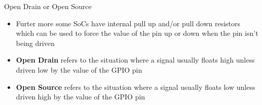 \begin{frame}
   {Open Drain or Open Source}
   \begin{itemize}
      \item Furter more some SoCs have internal pull up and/or pull down resistors
            which can be used to force the value of the pin up or down when the
            pin isn't being driven
      \item \textbf{Open Drain} refers to the situation where a signal usually
	      floats high unless driven low by the value of the GPIO pin
      \item \textbf{Open Source} refers to the situation where a signal usually
	      floats low unless driven high by the value of the GPIO pin
   \end{itemize}
\end{frame}

\cprotect\note{


}

